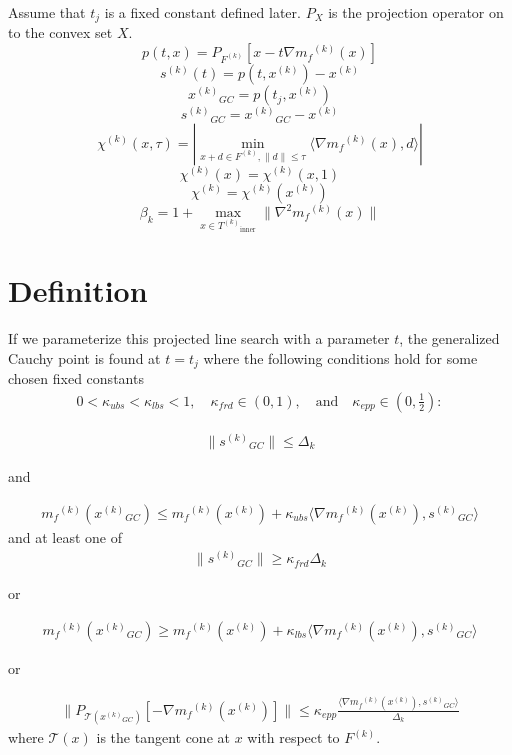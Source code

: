 \documentclass{article}
\theoremstyle{case}
\newcommand{\modelk}{{{m}_f}^{(k)}}
\newcommand{\gradmodelk}{\nabla{{m}_f}^{(k)}}
\newcommand{\iteratek}{{x}^{(k)}}
\newcommand{\trialk}{{s}^{(k)}}
\newcommand{\innertrk}{{T^{(k)}}_{\text{inner}}}
\newcommand{\feasiblek}{{F}^{(k)}}
\newcommand{\ptx}{p(t,x)}
\newcommand{\Px}{P_X}
\newcommand{\tj}{t_j}
\newcommand{\gck}{{{x}^{(k)}}_{GC}}
\newcommand{\sgck}{{{s}^{(k)}}_{GC}}
\newcommand{\chik}{{\chi^{(k)}}}
\begin{document}
Assume that $\tj$ is a fixed constant defined later.
$\Px$ is the projection operator on to the convex set $X$.
\[ \ptx = P_{\feasiblek}[x-t\gradmodelk(x)] \]
\[ \trialk(t) = p(t,\iteratek)-\iteratek \]
\[\gck = p(\tj, \iteratek)\]
\[\sgck = \gck-\iteratek\]
\[\chik(x, \tau) = | \min_{x+d \in \feasiblek, \|d\| \le \tau}\langle \gradmodelk(x), d\rangle|\]
\[\chik(x) = \chik(x, 1)\]
\[\chik = \chik(\iteratek)\]
\[\beta_k = 1 + \max_{x\in\innertrk}\|\nabla^2\modelk(x)\|\]

\newpage
\section{Definition}


If we parameterize this projected line search with a parameter $t$,
the generalized Cauchy point is found at $t=\tj$ where the following conditions hold
for some chosen fixed constants
\begin{align}
0 < \kappa_{ubs} < \kappa_{lbs} < 1, \quad \kappa_{frd} \in (0, 1), \quad \text{and} \quad\kappa_{epp} \in (0, \frac 1 2 ):
\end{align}

\begin{align}
\label{too_big_1}
\|\sgck\|\le \Delta_k
\end{align}
\begin{center}and\end{center}
\begin{align}
\label{too_big_2}
\modelk(\gck) \le \modelk(\iteratek) + \kappa_{ubs}\langle \gradmodelk(\iteratek), \sgck\rangle
\end{align}
and at least one of
\begin{align}
\label{too_small_1}
\|\sgck\| \ge \kappa_{frd}\Delta_k
\end{align}
\begin{center}or\end{center}
\begin{align}
\label{too_small_2}
\modelk(\gck) \ge \modelk(\iteratek) + \kappa_{lbs}\langle \nabla\modelk(\iteratek), \sgck\rangle
\end{align}
\begin{center}or\end{center}
\begin{align}
\label{too_small_3}
\|P_{\mathcal T(\gck)}[-\gradmodelk(\iteratek)]\| \le \kappa_{epp} \frac{\langle \nabla\modelk(\iteratek), \sgck \rangle}{\Delta_k}
\end{align}
where $\mathcal T(x)$ is the tangent cone at $x$ with respect to $\feasiblek$.
\end{document}
